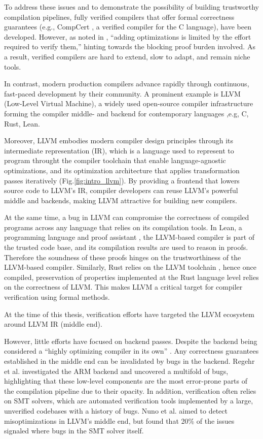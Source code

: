 \documentclass[review, anonymous, acmsmall, screen]{acmart}
\begin{document}
To address these issues and to demonstrate the possibility of building trustworthy compilation pipelines,
 fully verified compilers that offer formal correctness guarantees (e.g., CompCert \cite{compcert_web}, 
 a verified compiler for the C language), have been developed. However, as noted in \cite{Mullen2016}, 
 “adding optimizations is limited by the effort required to verify them,” hinting towards the blocking 
 proof burden involved. As a result, verified compilers are hard to extend, slow to adapt, and remain 
 niche tools.

 In contrast, modern production compilers advance rapidly through continuous, fast-paced development 
 by their community. A prominent example is LLVM (Low-Level Virtual Machine)\cite{llvm_ref}, 
 a widely used open-source compiler infrastructure forming the compiler middle- and backend for 
 contemporary languages ,e.g, C, Rust, Lean.

Moreover, LLVM embodies modern compiler design principles through its intermediate representation 
(IR), which is a language used to represent to program throught the compiler toolchain that enable 
language-agnostic optimizations, and its optimization architecture that applies transformation passes 
iteratively (Fig.\ref{fig:intro_llvm}). By providing a frontend that lowers source code to LLVM's IR,
compiler developers can reuse LLVM's powerful middle and backends, making LLVM attractive for building
new compilers.

At the same time, a bug in LLVM can compromise the correctness of compiled programs across any 
language that relies on its compilation tools. In Lean, a programming language and proof assistant 
\cite{Lean4}, the LLVM-based compiler is part of the trusted code base, and its compilation results 
are used to reason in proofs. Therefore the soundness of these proofs hinges on the trustworthiness 
of the LLVM-based compiler. Similarly, Rust relies on the LLVM toolchain \cite{Rustlantis}, hence 
once compiled, preservation of properties implemented at the Rust language level relies on the 
correctness of LLVM. This makes LLVM a critical target for compiler verification using formal methods.

At the time of this thesis, verification efforts have targeted the LLVM ecosystem around LLVM IR 
(middle end). 

However, little efforts have focused on backend passes. Despite the backend being considered a 
“highly optimizing compiler in its own” \cite{Regehr2025}. Any correctness guarantees established 
in the middle end can be invalidated by bugs in the backend. Regehr et al. \cite{Regehr2025} 
investigated the ARM backend and uncovered a multifold of bugs, highlighting that these low-level 
components are the most error-prone parts of the compilation pipeline due to their opacity\cite{Mullen2016}.
 In addition, verification often relies on SMT solvers, which are automated verification tools 
 implemented by a large, unverified codebases with a history of bugs. Nuno et al. \cite{Nuno2021Alive2} 
 aimed to detect misoptimizations in LLVM’s middle end, but found that 20\% of the issues signaled 
 where bugs in the SMT solver itself.
\end{document}
